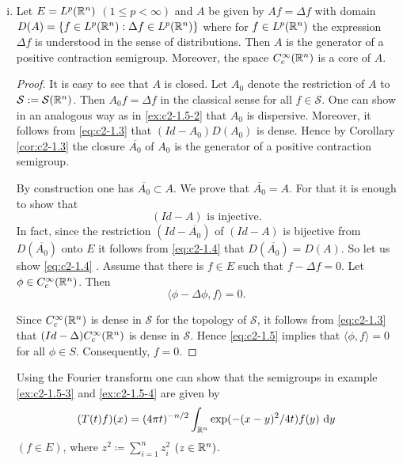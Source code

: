 \begin{examples}
\begin{enumerate}[(i), wide, labelsep=1em, itemindent=\parindent]
\item \label{ex:c2-1.5-4} 
Let $E = L^{p}(\mathbb{R}^{n})$ $(1 \leq p < \infty)$ and $A$ be given by $Af = \Delta f$ with domain $D(A) = \{f \in L^{p}(\mathbb{R}^{n}) : \Delta f \in L^{p}(\mathbb{R}^{n})\}$ where for $f \in L^{p}(\mathbb{R}^{n})$ the expression $\Delta f$ is understood in the sense of distributions. Then $A$ is the generator of a positive contraction semigroup. Moreover, the space $C_{c}^{\infty}(\mathbb{R}^{n})$ is a core of $A$.

\begin{proof}
It is easy to see that $A$ is closed. 
Let $A_{0}$ denote the restriction of $A$ to $\mathcal{S} := \mathcal{S}(\mathbb{R}^{n})$. 
Then $A_{0}f = \Delta f$ in the classical sense for all $f \in \mathcal{S}$.
One can show in an analogous way as in \ref{ex:c2-1.5-2}   that $A_{0}$ is dispersive. 
Moreover, it follows from \eqref{eq:c2-1.3} that $(Id - A_{0})D(A_{0})$ is dense. 
Hence by Corollary \ref{cor:c2-1.3}   the closure $\overline{A_{0}}$ of $A_{0}$ is the generator of a positive contraction semigroup.

By construction one has $\overline{A_{0}} \subset A$. 
We prove that $\overline{A_{0}} = A$. 
For that it is enough to show that
\begin{equation}\label{eq:c2-1.4}
(Id - A) \text{ is injective.}
\end{equation}
In fact, since the restriction $(Id - \overline{A_{0}})$ of $(Id - A)$ is bijective from $D(\overline{A_{0}})$ onto $E$ it follows from  \eqref{eq:c2-1.4}  that $D(\overline{A_{0}}) = D(A)$. 
So let us show  \eqref{eq:c2-1.4}  . 
Assume that there is $f \in E$ such that $f - \Delta f = 0$.
Let $\phi \in C_{c}^{\infty}(\mathbb{R}^{n})$. 
Then
\begin{equation} \label{eq:c2-1.5}
\langle \phi - \Delta\phi,f \rangle = 0.
\end{equation}

Since $C_{c}^{\infty}(\mathbb{R}^{n})$ is dense in $\mathcal{S}$ for the topology of $\mathcal{S}$, it follows from  \eqref{eq:c2-1.3}    that $(Id - \Delta)C_{c}^{\infty}(\mathbb{R}^{n})$ is dense in $\mathcal{S}$. Hence  \eqref{eq:c2-1.5}   implies
that $\langle \phi, f \rangle = 0$ for all $\phi \in S$. 
Consequently, $f = 0$.
\end{proof}

\begin{remark*}\label{rem:c2-1.3}
Using the Fourier transform one can show that the semigroups in example \ref{ex:c2-1.5-3}   and \ref{ex:c2-1.5-4}   are given by
\begin{equation}\label{eq:c2-1.6}
(T(t)f)(x) = (4\pi t)^{-n/2} \int_{\mathbb{R}^n} \exp(-(x-y)^{2}/4t) f(y) \, \mathop{}\!\mathrm{d}{y}
\end{equation}
$(f \in E)$, where $z^{2} \coloneqq \sum_{i=1}^n z_{i}^{2}$ $(z \in \mathbb{R}^n)$.
\end{remark*}


\end{enumerate}
\end{examples}
